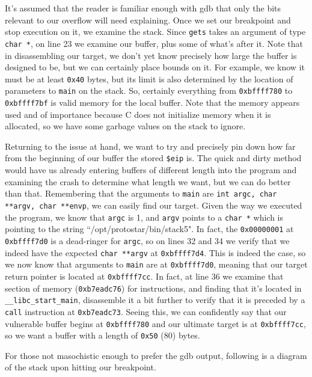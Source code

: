 It's assumed that the reader is familiar enough with gdb that only the bits relevant to our overflow
will need explaining. Once we set our breakpoint and stop execution on it, we examine the stack.
Since \texttt{gets} takes an argument of type \texttt{char *}, on line 23 we examine our buffer, 
plus some of what's after it. Note that in disassembling our target, we don't yet know precisely
how large the buffer is designed to be, but we can certainly place bounds on it. For example,
we know it must be at least \texttt{0x40} bytes, but its limit is also determined by the
location of parameters to \texttt{main} on the stack. So, certainly everything 
from \texttt{0xbffff780} to \texttt{0xbffff7bf} is valid memory for the local buffer. Note that
the memory appears used and of importance because C does not initialize memory when it is allocated,
so we have some garbage values on the stack to ignore.

Returning to the issue at hand, we want to try and precisely pin down how far from the beginning of our
buffer the stored \texttt{\$eip} is. The quick and dirty method would have us already entering
buffers of different length into the program and examining the crash to determine what length
we want, but we can do better than that. Remembering that the arguments to \texttt{main}
are \texttt{int argc, char **argv, char **envp}, we can easily find our target. Given the
way we executed the program, we know that \texttt{argc} is 1, and \texttt{argv} points to a
\texttt{char *} which is pointing to the string ``/opt/protostar/bin/stack5". In fact, the
\texttt{0x00000001} at \texttt{0xbffff7d0} is a dead-ringer for \texttt{argc}, so on lines
32 and 34 we verify that we indeed have the expected \texttt{char **argv} at \texttt{0xbffff7d4}.
This is indeed the case, so we now know that arguments to \texttt{main} are at \texttt{0xbffff7d0},
meaning that our target return pointer is located at \texttt{0xbffff7cc}. In fact, at line 36
we examine that section of memory (\texttt{0xb7eadc76}) for instructions, and finding that it's located
in \texttt{\_\_libc\_start\_main}, disassemble it a bit further to verify that it is preceded by a 
\texttt{call} instruction at \texttt{0xb7eadc73}. Seeing this, we can confidently say that
our vulnerable buffer begins at \texttt{0xbffff780} and our ultimate target is at \texttt{0xbffff7cc},
so we want a buffer with a length of \texttt{0x50} (80) bytes.

For those not masochistic enough to prefer the gdb output, following is a diagram of the stack upon hitting
our breakpoint.

